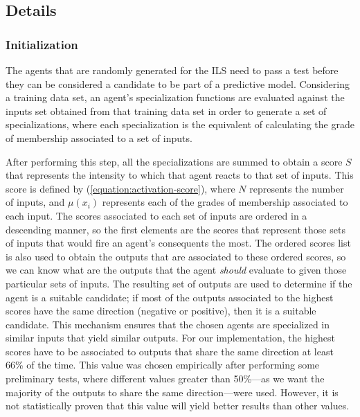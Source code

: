 \documentclass{ieeeaccess}
\begin{document}


\subsection{Details}
\label{subsection:details}

\subsubsection{Initialization}
\label{subsubsection:initialization}

The agents that are randomly generated for the ILS need to pass a test before they can be considered a candidate to be part of a predictive model. Considering a training data set, an agent's specialization functions are evaluated against the inputs set obtained from that training data set in order to generate a set of specializations, where each specialization is the equivalent of calculating the grade of membership associated to a set of inputs. 


After performing this step, all the specializations are summed to obtain a score $S$ that represents the intensity to which that agent reacts to that set of inputs. This score is defined by (\ref{equation:activation-score}), where $N$ represents the number of inputs, and $\mu(x_{i})$ represents each of the grades of membership associated to each input. The scores associated to each set of inputs are ordered in a descending manner, so the first elements are the scores that represent those sets of inputs that would fire an agent's consequents the most. The ordered scores list is also used to obtain the outputs that are associated to these ordered scores, so we can know what are the outputs that the agent \textit{should} evaluate to given those particular sets of inputs. The resulting set of outputs are used to determine if the agent is a suitable candidate; if most of the outputs associated to the highest scores have the same direction (negative or positive), then it is a suitable candidate. This mechanism ensures that the chosen agents are specialized in similar inputs that yield similar outputs. For our implementation, the highest scores have to be associated to outputs that share the same direction at least 66\% of the time. This value was chosen empirically after performing some preliminary tests, where different values greater than 50\%---as we want the majority of the outputs to share the same direction---were used. However, it is not statistically proven that this value will yield better results than other values.
\end{document}
